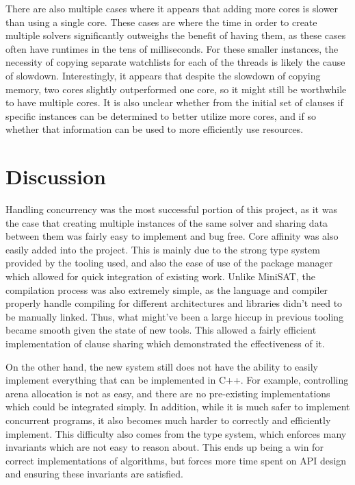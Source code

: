 \documentclass[11pt]{extarticle}
\begin{document}
There are also multiple cases where it appears that adding more cores is slower than using a
single core. These cases are where the time in order to create multiple solvers significantly
outweighs the benefit of having them, as these cases often have runtimes in the tens of
milliseconds. For these smaller instances, the necessity of copying separate watchlists for each
of the threads is likely the cause of slowdown. Interestingly, it appears that despite the
slowdown of copying memory, two cores slightly outperformed one core, so it might still be
worthwhile to have multiple cores. It is also unclear whether from the initial set of clauses if
specific instances can be determined to better utilize more cores, and if so whether that
information can be used to more efficiently use resources.

\section*{Discussion}
Handling concurrency was the most successful portion of this project, as it was the case that
creating multiple instances of the same solver and sharing data between them was fairly easy to
implement and bug free. Core affinity was also easily added into the project. This is mainly due
to the strong type system provided by the tooling used, and also the ease of use of the package
manager which allowed for quick integration of existing work. Unlike MiniSAT, the compilation
process was also extremely simple, as the language and compiler properly handle compiling for
different architectures and libraries didn't need to be manually linked. Thus, what might've been
a large hiccup in previous tooling became smooth given the state of new tools. This allowed a
fairly efficient implementation of clause sharing which demonstrated the effectiveness of it.

On the other hand, the new system still does not have the ability to easily implement everything
that can be implemented in C++. For example, controlling arena allocation is not as easy, and
there are no pre-existing implementations which could be integrated simply. In addition, while
it is much safer to implement concurrent programs, it also becomes much harder to correctly and
efficiently implement. This difficulty also comes from the type system, which enforces many
invariants which are not easy to reason about. This ends up being a win for correct
implementations of algorithms, but forces more time spent on API design and ensuring these
invariants are satisfied.
\end{document}
